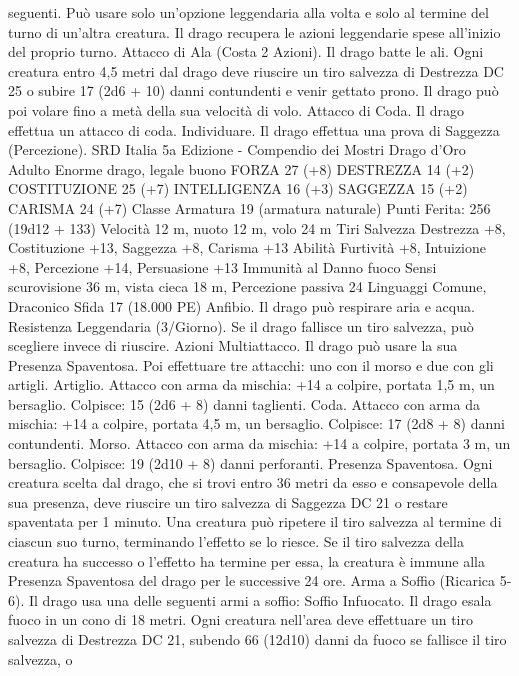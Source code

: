 \begin{multicols}{2}
seguenti. Può usare solo un’opzione leggendaria alla volta e solo
al termine del turno di un’altra creatura. Il drago recupera le
azioni leggendarie spese all’inizio del proprio turno.
Attacco di Ala (Costa 2 Azioni). Il drago batte le ali. Ogni
creatura entro 4,5 metri dal drago deve riuscire un tiro salvezza
di Destrezza DC 25 o subire 17 (2d6 + 10) danni contundenti e
venir gettato prono. Il drago può poi volare fino a metà della sua
velocità di volo.
Attacco di Coda. Il drago effettua un attacco di coda.
Individuare. Il drago effettua una prova di Saggezza
(Percezione).
SRD Italia 5a Edizione - Compendio dei Mostri
Drago d’Oro Adulto
Enorme drago, legale buono
FORZA 27 (+8)
DESTREZZA 14 (+2)
COSTITUZIONE 25 (+7)
INTELLIGENZA 16 (+3)
SAGGEZZA 15 (+2)
CARISMA 24 (+7)
Classe Armatura 19 (armatura naturale)
\hspace*{0pt}\hfill{Punti Ferita}: 256 (19d12 + 133)
Velocità 12 m, nuoto 12 m, volo 24 m
Tiri Salvezza Destrezza +8, Costituzione +13, Saggezza +8,
Carisma +13
Abilità Furtività +8, Intuizione +8, Percezione +14, Persuasione +13
Immunità al Danno fuoco
Sensi scurovisione 36 m, vista cieca 18 m, Percezione passiva 24
Linguaggi Comune, Draconico
Sfida 17 (18.000 PE)
Anfibio. Il drago può respirare aria e acqua.
Resistenza Leggendaria (3/Giorno). Se il drago fallisce un tiro
salvezza, può scegliere invece di riuscire.
Azioni
Multiattacco. Il drago può usare la sua Presenza Spaventosa. Poi
effettuare tre attacchi: uno con il morso e due con gli artigli.
Artiglio. Attacco con arma da mischia: +14 a colpire, portata 1,5
m, un bersaglio.
Colpisce: 15 (2d6 + 8) danni taglienti.
Coda. Attacco con arma da mischia: +14 a colpire, portata 4,5
m, un bersaglio.
Colpisce: 17 (2d8 + 8) danni contundenti.
Morso. Attacco con arma da mischia: +14 a colpire, portata 3 m,
un bersaglio.
Colpisce: 19 (2d10 + 8) danni perforanti.
Presenza Spaventosa. Ogni creatura scelta dal drago, che si trovi
entro 36 metri da esso e consapevole della sua presenza, deve
riuscire un tiro salvezza di Saggezza DC 21 o restare spaventata per
1 minuto. Una creatura può ripetere il tiro salvezza al termine di
ciascun suo turno, terminando l’effetto se lo riesce. Se il tiro salvezza
della creatura ha successo o l’effetto ha termine per essa, la creatura è
immune alla Presenza Spaventosa del drago per le successive 24 ore.
Arma a Soffio (Ricarica 5-6). Il drago usa una delle seguenti armi
a soffio:
Soffio Infuocato. Il drago esala fuoco in un cono di 18 metri. Ogni
creatura nell’area deve effettuare un tiro salvezza di Destrezza DC
21, subendo 66 (12d10) danni da fuoco se fallisce il tiro salvezza, o

\end{multicols}
